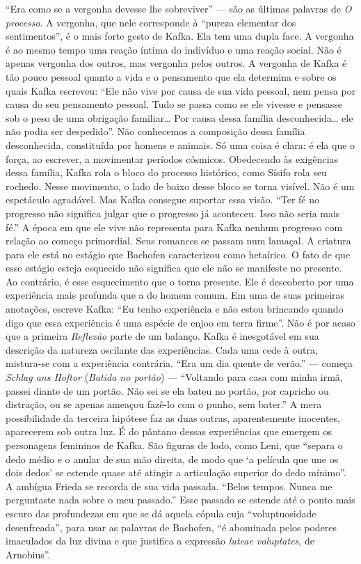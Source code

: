 ``Era como se a vergonha devesse lhe sobreviver'' --- são as últimas
palavras de \textit{O processo}. A vergonha, que nele corresponde à ``pureza
elementar dos sentimentos'', é o mais forte gesto de Kafka. Ela tem uma
dupla face. A vergonha é ao mesmo tempo uma reação íntima do indivíduo e
uma reação social. Não é apenas vergonha dos outros, mas vergonha pelos
outros. A vergonha de Kafka é tão pouco pessoal quanto a vida e o
pensamento que ela determina e sobre os quais Kafka escreveu: ``Ele não
vive por causa de sua vida pessoal, nem pensa por causa do seu
pensamento pessoal. Tudo se passa como se ele vivesse e pensasse sob o
peso de uma obrigação familiar\ldots{} Por causa dessa família
desconhecida\ldots{} ele não podia ser despedido''. Não conhecemos a
composição dessa família desconhecida, constituída por homens e animais.
Só uma coisa é clara: é ela que o força, ao escrever, a movimentar
períodos cósmicos. Obedecendo às exigências dessa família, Kafka rola o
bloco do processo histórico, como Sísifo rola seu rochedo. Nesse
movimento, o lado de baixo desse bloco se torna visível. Não é um
espetáculo agradável. Mas Kafka consegue suportar essa visão. ``Ter fé
no progresso não significa julgar que o progresso já aconteceu. Isso não
seria mais fé.'' A época em que ele vive não representa para Kafka
nenhum progresso com relação ao começo primordial. Seus romances se
passam num lamaçal. A criatura para ele está no estágio que Bachofen
caracterizou como hetaírico. O fato de que esse estágio esteja esquecido
não significa que ele não se manifeste no presente. Ao contrário, é esse
esquecimento que o torna presente. Ele é descoberto por uma experiência
mais profunda que a do homem comum. Em uma de suas primeiras anotações,
escreve Kafka: ``Eu tenho experiência e não estou brincando quando digo
que essa experiência é uma espécie de enjoo em terra firme''. Não é por
acaso que a primeira \textit{Reflexão} parte de um balanço. Kafka é inesgotável
em sua descrição da natureza oscilante das experiências. Cada uma cede à
outra, mistura-se com a experiência contrária. ``Era um dia quente de
verão.'' --- começa \textit{Schlag ans Hoftor} (\textit{Batida no portão}) ---
``Voltando para casa com minha irmã, passei diante de um portão. Não sei
se ela bateu no portão, por capricho ou distração, ou se apenas ameaçou
fazê-lo com o punho, sem bater.'' A mera possibilidade da terceira
hipótese faz as duas outras, aparentemente inocentes, aparecerem sob
outra luz. É do pântano dessas experiências que emergem os personagens
femininos de Kafka. São figuras de lodo, como Leni, que ``separa o dedo
médio e o anular de sua mão direita, de modo que `a película que une os
dois dedos' se estende quase até atingir a articulação superior do dedo
mínimo''. A ambígua Frieda se recorda de sua vida passada. ``Belos
tempos. Nunca me perguntaste nada sobre o meu passado.'' Esse passado se
estende até o ponto mais escuro das profundezas em que se dá aquela
cópula cuja ``voluptuosidade desenfreada'', para usar as palavras de
Bachofen, ``é abominada pelos poderes imaculados da luz divina e que
justifica a expressão \textit{luteae voluptates}, de Arnobius''.


